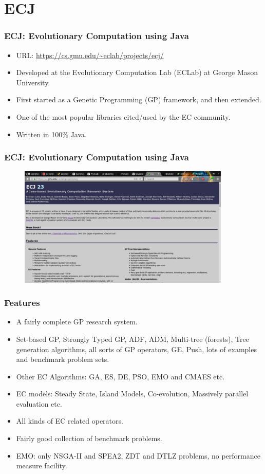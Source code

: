 \documentclass{beamer}
\begin{document}
\section{ECJ}		%
\begin{frame}
	\frametitle{ECJ: \textbf{E}volutionary \textbf{C}omputation using \textbf{J}ava}
	\begin{itemize}
		\item URL: \url{https://cs.gmu.edu/~eclab/projects/ecj/}
		\item Developed at the Evolutionary Computation Lab (ECLab) at George Mason University.
		\item First started as a Genetic Programming (GP) framework, and then extended.
		\item One of the most popular libraries cited/used by the EC community.
		\item Written in 100\% Java.
	\end{itemize}
\end{frame}
\begin{frame}
	\frametitle{ECJ: Evolutionary Computation using Java}
	\begin{figure}
		\includegraphics[width=0.9\textwidth,keepaspectratio]{ecj-url.pdf}
	\end{figure}
\end{frame}
\begin{frame}
	\frametitle{Features}
	\begin{footnotesize}
	\begin{itemize}
		\item A fairly complete GP research system.
		\item Set-based GP, Strongly Typed GP, ADF, ADM, Multi-tree (forests), Tree generation algorithms, all sorts of GP operators, GE, Push, lots of examples and benchmark problem sets.
		\item Other EC Algorithms: GA, ES, DE, PSO, EMO and CMAES etc.
		\item EC models: Steady State, Island Models, Co-evolution, Massively parallel evaluation etc.
		\item All kinds of EC related operators.
		\item Fairly good collection of benchmark problems.
		\item EMO: only NSGA-II and SPEA2, ZDT and DTLZ problems, no performance measure facility.
	\end{itemize}
	\end{footnotesize}
\end{frame}
\end{document}
